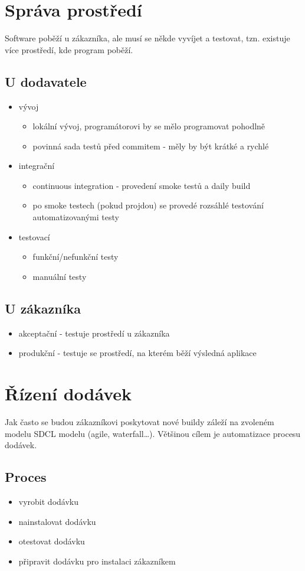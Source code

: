 \documentclass{szzclass}
\begin{document}
\section{Správa prostředí}
Software poběží u zákazníka, ale musí se někde vyvíjet a testovat, tzn. existuje více prostředí, kde program poběží.
\subsection{U dodavatele}
\begin{itemize}
  \item vývoj
  \begin{itemize}
    \item lokální vývoj, programátorovi by se mělo programovat pohodlně
    \item povinná sada testů před commitem - měly by být krátké a rychlé 
  \end{itemize}
  \item integrační
  \begin{itemize}
    \item continuous integration - provedení smoke testů a daily build
    \item po smoke testech (pokud projdou) se provedé rozsáhlé testování automatizovanými testy
  \end{itemize}
  \item testovací
  \begin{itemize}
    \item funkční/nefunkční testy
    \item manuální testy
  \end{itemize}
\end{itemize}
\subsection{U zákazníka}
\begin{itemize}
  \item akceptační - testuje prostředí u zákazníka
  \item produkční - testuje se prostředí, na kterém běží výsledná aplikace
\end{itemize}
\section{Řízení dodávek}
Jak často se budou zákazníkovi poskytovat nové buildy záleží na zvoleném modelu SDCL modelu (agile, waterfall\dots).
Většinou cílem je automatizace procesu dodávek.
\subsection{Proces}
\begin{itemize}
  \item vyrobit dodávku
  \item nainstalovat dodávku
  \item otestovat dodávku
  \item připravit dodávku pro instalaci zákazníkem
\end{itemize}
\end{document}
